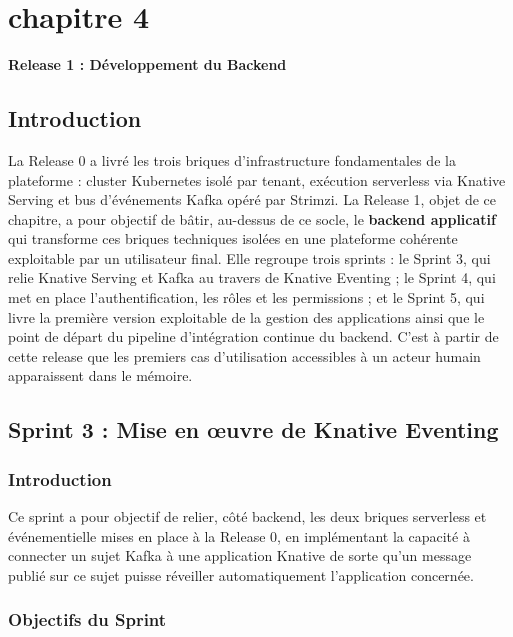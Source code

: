 \chapter*{chapitre 4}

\textbf{\Huge Release 1 : Développement du Backend}

\setcounter{chapter}{4}
\setcounter{section}{0}

\section{Introduction}

La Release 0 a livré les trois briques d'infrastructure fondamentales de la plateforme : cluster Kubernetes isolé par tenant, exécution serverless via Knative Serving et bus d'événements Kafka opéré par Strimzi. La Release 1, objet de ce chapitre, a pour objectif de bâtir, au-dessus de ce socle, le \textbf{backend applicatif} qui transforme ces briques techniques isolées en une plateforme cohérente exploitable par un utilisateur final. Elle regroupe trois sprints : le Sprint 3, qui relie Knative Serving et Kafka au travers de Knative Eventing ; le Sprint 4, qui met en place l'authentification, les rôles et les permissions ; et le Sprint 5, qui livre la première version exploitable de la gestion des applications ainsi que le point de départ du pipeline d'intégration continue du backend. C'est à partir de cette release que les premiers cas d'utilisation accessibles à un acteur humain apparaissent dans le mémoire.


\section{Sprint 3 : Mise en œuvre de Knative Eventing}

\subsection{Introduction}

Ce sprint a pour objectif de relier, côté backend, les deux briques serverless et événementielle mises en place à la Release 0, en implémentant la capacité à connecter un sujet Kafka à une application Knative de sorte qu'un message publié sur ce sujet puisse réveiller automatiquement l'application concernée.

\subsection{Objectifs du Sprint}

